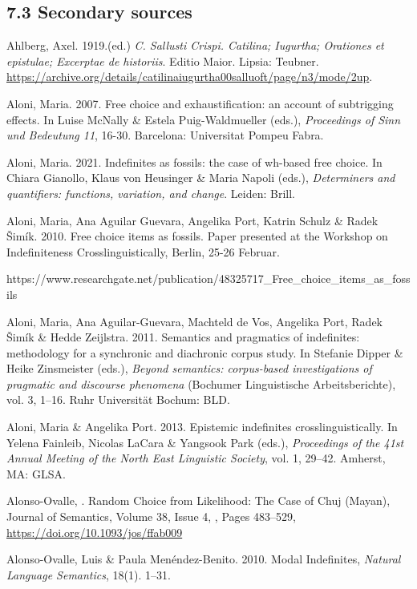 \documentclass[output=paper]{langscibook}
\begin{document}
\subsection{7.3 Secondary sources}

Ahlberg, Axel. 1919.(ed.) \textit{C. Sallusti Crispi. Catilina; Iugurtha; Orationes et epistulae; Excerptae de historiis}. Editio Maior. Lipsia: Teubner. \url{https://archive.org/details/catilinaiugurtha00salluoft/page/n3/mode/2up}.

Aloni, Maria. 2007. Free choice and exhaustification: an account of subtrigging effects. In Luise McNally \& Estela Puig-Waldmueller (eds.), \textit{Proceedings of Sinn und Bedeutung 11}, 16-30. Barcelona: Universitat Pompeu Fabra.

\begin{styleDLiteratur}
Aloni, Maria. 2021. Indefinites as fossils: the case of wh-based free choice. In Chiara Gianollo, Klaus von Heusinger \& Maria Napoli (eds.), \textit{Determiners and quantifiers: functions, variation, and change}. Leiden: Brill.
\end{styleDLiteratur}

Aloni, Maria, Ana Aguilar Guevara, Angelika Port, Katrin Schulz \& Radek Šimík. 2010. Free choice items as fossils. Paper presented at the Workshop on Indefiniteness Crosslinguistically, Berlin, 25-26 Februar. 

  {https://www.researchgate.net/publication/48325717\_Free\_choice\_items\_as\_fossils}

Aloni, Maria, Ana Aguilar-Guevara, Machteld de Vos, Angelika Port, Radek Šimík \& Hedde Zeijlstra. 2011. Semantics and pragmatics of indefinites: methodology for a synchronic and diachronic corpus study. In Stefanie Dipper \& Heike Zinsmeister (eds.), \textit{Beyond semantics: corpus-based investigations of pragmatic and discourse phenomena} (Bochumer Linguistische Arbeitsberichte), vol. 3, 1–16. Ruhr Universität Bochum: BLD.

Aloni, Maria \& Angelika Port. 2013. Epistemic indefinites crosslinguistically. In Yelena Fainleib, Nicolas LaCara \& Yangsook Park (eds.), \textit{Proceedings of the 41st Annual Meeting of the North East Linguistic Society}, vol. 1, 29–42. Amherst, MA: GLSA.

Alonso-Ovalle, \citealt{LuisRoyer2021}. Random Choice from Likelihood: The Case of Chuj (Mayan), Journal of Semantics, Volume 38, Issue 4, \citealt{November2021}, Pages 483–529, \url{https://doi.org/10.1093/jos/ffab009}

Alonso-Ovalle, Luis \& Paula Menéndez-Benito. 2010. Modal Indefinites, \emph{\textmd{\textit{Natural Language Semantics}}}, 18(1). 1–31.
\end{document}
